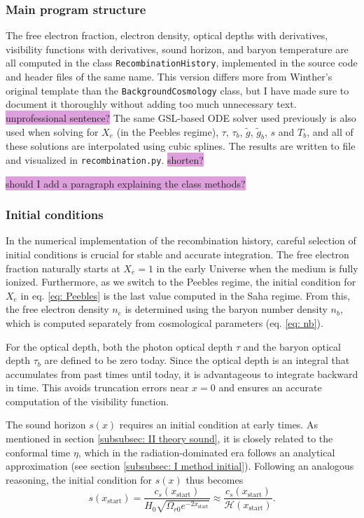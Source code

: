 \documentclass{aa}
\numberwithin{equation}{section}
\numberwithin{table}{section}
\numberwithin{figure}{section}
\begin{document}
\subsubsection{Main program structure}
The free electron fraction, electron density, optical depths with derivatives, visibility functions with derivatives, sound horizon, and baryon temperature are all computed in the class \verb|RecombinationHistory|, implemented in the source code and header files of the same name. This version differs more from Winther's original template than the \verb|BackgroundCosmology| class, but I have made sure to document it thoroughly without adding too much unnecessary text. \colorbox{Plum}{unprofessional sentence?} The same GSL-based ODE solver used previously is also used when solving for $X_e$ (in the Peebles regime), $\tau$, $\tau_b$, $\tilde{g}$, $\tilde{g}_b$, $s$ and $T_b$, and all of these solutions are interpolated using cubic splines. The results are written to file and visualized in \verb|recombination.py|. \colorbox{Plum}{shorten?}

\colorbox{Plum}{should I add a paragraph explaining the class methods?}


\subsubsection{Initial conditions}
In the numerical implementation of the recombination history, careful selection of initial conditions is crucial for stable and accurate integration. The free electron fraction naturally starts at $X_e = 1$ in the early Universe when the medium is fully ionized. Furthermore, as we switch to the Peebles regime, the initial condition for $X_e$ in eq. \eqref{eq: Peebles} is the last value computed in the Saha regime. From this, the free electron density $n_e$ is determined using the baryon number density $n_b$, which is computed separately from cosmological parameters (eq. \eqref{eq: nb}). 

For the optical depth, both the photon optical depth $\tau$ and the baryon optical depth $\tau_b$ are defined to be zero today. Since the optical depth is an integral that accumulates from past times until today, it is advantageous to integrate backward in time. This avoids truncation errors near $x = 0$ and ensures an accurate computation of the visibility function.

The sound horizon $s(x)$ requires an initial condition at early times. As mentioned in section \ref{subsubsec: II theory sound}, it is closely related to the conformal time $\eta$, which in the radiation-dominated era follows an analytical approximation (see section \ref{subsubsec: I method initial}). Following an analogous reasoning, the initial condition for $s(x)$ thus becomes
\begin{equation}
  s(x_\text{start}) = \frac{c_s(x_\text{start})}{H_0\sqrt{\Omega_{r0}e^{-2x_\text{start}}}} \approx \frac{c_s(x_\text{start})}{\mathcal{H}(x_{\text{start}})}.
\end{equation}
\end{document}
